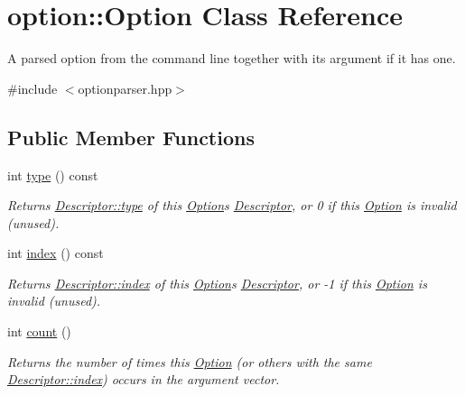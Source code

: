 \hypertarget{classoption_1_1Option}{}\section{option\+:\+:Option Class Reference}
\label{classoption_1_1Option}


A parsed option from the command line together with its argument if it has one.  




{\ttfamily \#include $<$optionparser.\+hpp$>$}

\subsection*{Public Member Functions}
\begin{DoxyCompactItemize}
\item 
int \hyperlink{classoption_1_1Option_a5268a69e1a91137186ab772574296da0}{type} () const
\begin{DoxyCompactList}\small\item\em Returns \hyperlink{structoption_1_1Descriptor_a1b220dabd8aad075fa441a80f9b9343c}{Descriptor\+::type} of this \hyperlink{classoption_1_1Option}{Option}\textquotesingle{}s \hyperlink{structoption_1_1Descriptor}{Descriptor}, or 0 if this \hyperlink{classoption_1_1Option}{Option} is invalid (unused). \end{DoxyCompactList}\item 
\mbox{\label{classoption_1_1Option_a847d12e8e76add769fbd01c703e48682}} 
int \hyperlink{classoption_1_1Option_a847d12e8e76add769fbd01c703e48682}{index} () const
\begin{DoxyCompactList}\small\item\em Returns \hyperlink{structoption_1_1Descriptor_a1fee8ac44f529c99ac2b1149b4c391b1}{Descriptor\+::index} of this \hyperlink{classoption_1_1Option}{Option}\textquotesingle{}s \hyperlink{structoption_1_1Descriptor}{Descriptor}, or -\/1 if this \hyperlink{classoption_1_1Option}{Option} is invalid (unused). \end{DoxyCompactList}\item 
int \hyperlink{classoption_1_1Option_a8a632dcd89af60fe0806deb756c08f14}{count} ()
\begin{DoxyCompactList}\small\item\em Returns the number of times this \hyperlink{classoption_1_1Option}{Option} (or others with the same \hyperlink{structoption_1_1Descriptor_a1fee8ac44f529c99ac2b1149b4c391b1}{Descriptor\+::index}) occurs in the argument vector. \end{DoxyCompactList}\item 

\end{DoxyCompactItemize}
